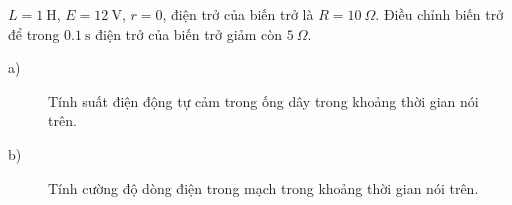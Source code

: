\begin{enumerate}
{\begin{center}
		\end{center}
	$L=\SI{1}{\henry}$, $E=\SI{12}{\volt}$, $r=0$, điện trở của biến trở là $R=\SI{10}{\Omega}$. Điều chỉnh biến trở để trong $\SI{0.1}{\second}$ điện trở của biến trở giảm còn $\SI{5}{\Omega}$.
	\begin{description}
		\item[a)] Tính suất điện động tự cảm trong ống dây trong khoảng thời gian nói trên.
		\item[b)] Tính cường độ dòng điện trong mạch trong khoảng thời gian nói trên.
		\end{description}
	}
\end{enumerate}
